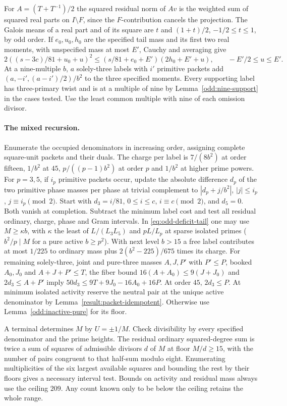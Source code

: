 \documentclass[11pt]{amsart}
\numberwithin{equation}{section}
\theoremstyle{definition}
\theoremstyle{plain}
\begin{document}
For $A=(T+T^{-1})/2$ the squared residual norm of $Av$ is the
weighted sum of squared real parts on $I\setminus F$, since the
$F$-contribution cancels the projection. The Galois means of a real
part and of its square are $t$ and $(1+t)/2$, $-1/2\le t\le1$, by
odd order. If $e_0,u_0,h_0$ are the specified tail mass and its first
two real moments, with unspecified mass at most $E'$, Cauchy and
averaging give
\[
 2((s-3c)/81+u_0+u)^2\le(s/81+e_0+E')(2h_0+E'+u),
 \qquad -E'/2\le u\le E'.
\]
At a nine-multiple $b$, $a$ solely-three labels with $i'$ primitive
packets add $(a,-i',(a-i')/2)/b^2$ to the three specified moments.
Every supporting label has three-primary twist and is at a multiple
of nine by Lemma~\ref{odd:nine-support} in the cases tested. Use the
least common multiple with nine of each omission divisor.

\paragraph{The mixed recursion.}
Enumerate the occupied denominators in increasing order, assigning
complete square-unit packets and their duals. The charge per label is
$7/(8b^2)$ at order fifteen, $1/b^2$ at $45$, $p/((p-1)b^2)$ at order
$p$ and $1/b^2$ at higher prime powers. For $p=3,5$, if $i_p$ primitive
packets occur, update the absolute difference $d_p$ of the two
primitive phase masses per phase at trivial complement to
$|d_p+j/b^2|$, $|j|\le i_p$, $j\equiv i_p\pmod2$.
Start with $d_3=i/81$, $0\le i\le c$, $i\equiv c\pmod2$, and $d_5=0$.
Both vanish at completion. Subtract the minimum label cost and test
all residual ordinary, charge, phase and Gram intervals. In
\eqref{eq:odd-deficit-tail} one may use $M\ge\kappa b$, with $\kappa$
the least of $L/(L_3L_5)$ and $pL/L_p$ at sparse isolated primes
($b^2/p\mid M$ for a pure active $b\ge p^2$). With next level $b>15$
a free label contributes at most $1/225$ to ordinary mass plus
$2(b^2-225)/675$ times its charge. For remaining solely-three,
joint and pure-three masses $A,J,P'$ with $P'\le P$, booked
$A_0,J_0$ and $A+J+P'\le T$, the fiber bound
$16(A+A_0)\le9(J+J_0)$ and $2d_3\le A+P'$ imply
$50d_3\le9T+9J_0-16A_0+16P$. At order $45$, $2d_3\le P$.
At minimum isolated activity reserve the neutral pair at the unique
active denominator by Lemma~\ref{result:packet-idempotent}.
Otherwise use Lemma~\ref{odd:inactive-pure} for its floor.

A terminal determines $M$ by $U=\pm1/M$. Check divisibility by every
specified denominator and the prime heights. The residual ordinary
squared-degree sum is twice a sum of squares of admissible divisors
$d$ of $M$ at floor $M/d\ge15$, with the number of pairs congruent to
that half-sum modulo eight. Enumerating multiplicities of the six
largest available squares and bounding the rest by their floors gives
a necessary interval test. Bounds on activity and residual mass always
use the ceiling $209$. Any count known only to be below the ceiling
retains the whole range.
\end{document}
